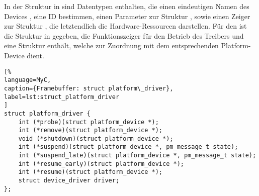 In der Struktur in  sind Datentypen enthalten, die einen eindeutigen Namen des Devices , eine ID   bestimmen, einen Parameter zur Struktur , sowie einen Zeiger zur Struktur , die letztendlich die Hardware-Ressourcen darstellen. Für den  ist die Struktur  in  gegeben, die Funktionszeiger für den Betrieb des Treibers und eine Struktur  enthält, welche zur Zuordnung mit dem entsprechenden Platform-Device dient.
\begin{lstlisting}[%
language=MyC,
caption={Framebuffer: struct platform\_driver},
label=lst:struct_platform_driver
]
struct platform_driver {
	int (*probe)(struct platform_device *);
	int (*remove)(struct platform_device *);
	void (*shutdown)(struct platform_device *);
	int (*suspend)(struct platform_device *, pm_message_t state);
	int (*suspend_late)(struct platform_device *, pm_message_t state);
	int (*resume_early)(struct platform_device *);
	int (*resume)(struct platform_device *);
	struct device_driver driver;
};
\end{lstlisting}

